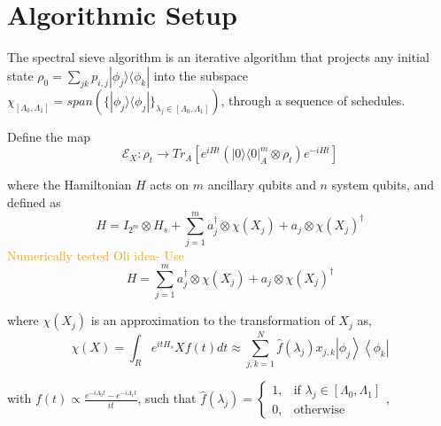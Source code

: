 \documentclass[10pt]{amsart}
\newcommand{\dmat}[1]{{| #1 \rangle \langle #1 |}}
\newcommand{\dm}[2]{\left|#1\right\rangle\left\langle#2\right|}
\begin{document}
\section{Algorithmic Setup}
The spectral sieve algorithm is an iterative algorithm that projects any initial state $\rho_0 = \sum_{jk} p_{i,j} | \phi_j \rangle \langle \phi_k |$ into the subspace $\chi_{[\Lambda_0, \Lambda_1]} = span(\{ \dmat{\phi_j} \}_{\lambda_j \in [\Lambda_0, \Lambda_1]})$, through a sequence of schedules. 

Define the map 
\begin{equation}
    \label{eq_map}
     \mathcal{E}_{X} : \rho_t \rightarrow Tr_A [ e^{iHt} (\dmat{0}^{m}_A\otimes \rho_t) e^{-iHt} ] 
     \end{equation}

where the Hamiltonian $H$ acts on $m$ ancillary qubits and $n$ system qubits, and defined as 
\begin{equation}
    \label{eq_H}
    H = I_{2^m} \otimes H_s + \sum_{j=1}^m a^{\dagger}_j \otimes \chi(X_j) + a_j \otimes \chi(X_j)^{\dagger}
\end{equation}
\textcolor{orange}{Numerically tested Oli idea- Use}
\begin{equation}
    \label{eq_OliH}
    H = \sum_{j=1}^m a^{\dagger}_j \otimes \chi(X_j) + a_j \otimes \chi(X_j)^{\dagger}
\end{equation}


where $\chi(X_j)$ is an approximation to the transformation of $X_j$ as,
\begin{equation}
    \label{eq_chi}
    \chi (X) = \int_R e^{itH_s} X f(t)dt \approx \sum_{j,k=1}^{N} \hat{f}({\lambda_j})x_{j,k} \dm{\phi_j}{\phi_k}
\end{equation}

with $f(t) \propto \frac{e^{-i \Lambda_0 t} - e^{-i \Lambda_1 t} }{it}$, such that 
$\hat{f}(\lambda_j) =  \begin{cases} 1, & \text{if } \lambda_j \in [\Lambda_0, \Lambda_1] \\ 0, & \text{otherwise } \end{cases}$,
\end{document}
